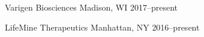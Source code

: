 



\begin{cvhonors}



  \cvhonor
    {Varigen Biosciences} %
    {Madison, WI} %
    {2017--present} %
    
  \cvhonor
    {LifeMine Therapeutics} %
    {Manhattan, NY} %
    {2016--present} %

\end{cvhonors}